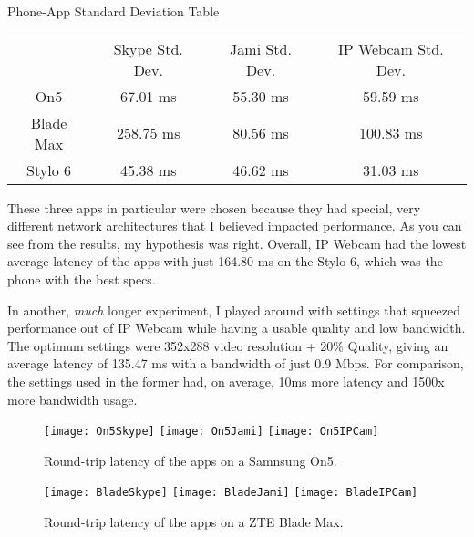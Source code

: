 \begin{centering}
Phone-App Standard Deviation Table\\[0.5cm]

\begin{tabular}{c|c|c|c}
    & Skype Std. Dev. & Jami Std. Dev. & IP Webcam Std. Dev. \\[0.5cm]
    On5 & 67.01 ms & 55.30 ms & 59.59 ms \\[0.5cm]
    Blade Max & 258.75 ms & 80.56 ms & 100.83 ms \\[0.5cm]
    Stylo 6 & 45.38 ms & 46.62 ms & 31.03 ms
\end{tabular} \newline

\end{centering}

These three apps in particular were chosen because they had special, very different network architectures that I believed impacted performance. As you can see from the results, my hypothesis was right. Overall, IP Webcam had the lowest average latency of the apps with just 164.80 ms on the Stylo 6, which was the phone with the best specs.

In another, \textit{much} longer experiment, I played around with settings that squeezed performance out of IP Webcam while having a usable quality and low bandwidth. The optimum settings were 352x288 video resolution + 20\% Quality, giving an average latency of 135.47 ms with a bandwidth of just 0.9 Mbps. For comparison, the settings used in the former had, on average, 10ms more latency and 1500x more bandwidth usage.


\begin{figure}[!htb]
    \centering
    \texttt{[image: On5Skype]}
    \texttt{[image: On5Jami]}
    \texttt{[image: On5IPCam]}
    \caption{
        Round-trip latency of the apps on a Samnsung On5.
    }
\end{figure}

\begin{figure}[!htb]
    \centering
    \texttt{[image: BladeSkype]}
    \texttt{[image: BladeJami]}
    \texttt{[image: BladeIPCam]}
    \caption{
        Round-trip latency of the apps on a ZTE Blade Max.
    }
\end{figure}


